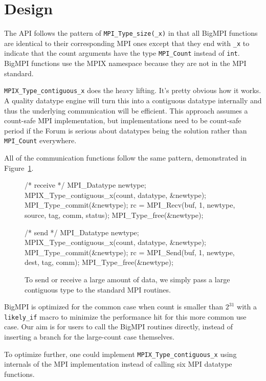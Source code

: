
\section{Design}

The API follows the pattern of \texttt{MPI\_Type\_size(\_x)} in that all BigMPI
functions are identical to their corresponding MPI ones except that
they end with \texttt{\_x} to indicate that the count arguments have the type
\texttt{MPI\_Count} instead of \texttt{int}.
BigMPI functions use the MPIX namespace because they are not in the
MPI standard.


\texttt{MPIX\_Type\_contiguous\_x}
does the heavy lifting.  It's pretty obvious how it works.
A quality datatype engine will turn this into a contiguous datatype internally 
and thus the underlying communication will be efficient.  
This approach assumes a count-safe MPI implementation, but implementations need
to be count-safe period if the Forum is serious about datatypes being
the solution rather than \texttt{MPI\_Count} everywhere.

All of the communication functions follow the same pattern, demonstrated in
Figure~\ref{code:sendrecx}.
\begin{figure}
\begin{code}
/* receive */
MPI_Datatype newtype;
MPIX_Type_contiguous_x(count, datatype, &newtype);
MPI_Type_commit(&newtype);
rc = MPI_Recv(buf, 1, newtype, source, tag, comm, status);
MPI_Type_free(&newtype);

/* send */
MPI_Datatype newtype;
MPIX_Type_contiguous_x(count, datatype, &newtype);
MPI_Type_commit(&newtype);
rc = MPI_Send(buf, 1, newtype, dest, tag, comm);
MPI_Type_free(&newtype);
\end{code}
\caption{To send or receive a large amount of data, we simply pass a large
contiguous type to the standard MPI routines.}
\label{code:sendrecx}

\end{figure}

BigMPI is optimized for the common case when count is smaller than $2^{31}$
with a \texttt{likely\_if} macro to minimize the performance hit for
this more common use case.  Our aim is for users to call the BigMPI routines
directly, instead of inserting a branch for the large-count case themselves.

To optimize further, one could implement
\texttt{MPIX\_Type\_contiguous\_x} using internals of the MPI implementation
instead of calling six MPI datatype functions.

